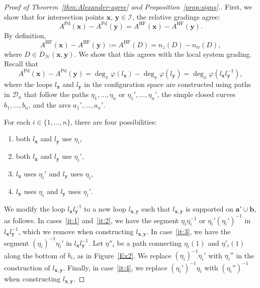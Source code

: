\documentclass[11pt]{amsart}
\numberwithin{equation}{section}
\numberwithin{figure}{section}
\theoremstyle{definition}
\newcommand{\cD}{\mathcal{D}}
\newcommand{\cH}{\mathcal{H}}
\newcommand{\cI}{\mathcal{I}}
\DeclareMathOperator{\HF}{HF}
\DeclareMathOperator{\Pd}{Pd}
\newcommand{\ba}{\boldsymbol{a}}
\newcommand{\bb}{\boldsymbol{b}}
\newcommand{\xs}{\boldsymbol{x}}
\newcommand{\ys}{\boldsymbol{y}}
\begin{document}
\thmidgr*

\begin{proof}[Proof of Theorem~\ref{thm:Alexander-agree} and Proposition~\ref{prop:signs}.] First, we show that for intersection points $\xs$, $\ys \in \cI$, the relative gradings agree:
\begin{equation}\label{eqn:Alexander-agree}
A^{\Pd}(\xs)-A^{\Pd}(\ys) = A^{\HF}(\xs) - A^{\HF}(\ys).
\end{equation}
By definition,
\[
A^{\HF}(\xs)-A^{\HF}(\ys) := A^{\HF}(D) = n_z(D) - n_w(D),
\]
where $D \in D_\cH(\xs, \ys)$.
We show that this agrees with the local system grading. Recall that
\begin{equation}
A^{\Pd}(\xs) - A^{\Pd}(\ys)= \deg_x \varphi (l_{\xs}) - \deg_x \varphi(l_{\ys}) = \deg_x \varphi(l_{\xs}l_{\ys}^{-1}),
\end{equation}
where the loops $l_{\xs}$ and $l_{\ys}$ in the configuration space are constructed using paths in $\cD_n$ that follow the paths $\eta_1,\dots,\eta_n$ or $\eta_1',\dots,\eta_n'$, the simple closed curves $b_1, \dots, b_n$, and the arcs $a_1',\dots,a_n'$.

For each $i \in \{1,\dots,n\}$, there are four possibilities:
\begin{enumerate}
    \item\label{it:1} both $l_{\xs}$ and $l_{\ys}$ use $\eta_i$,
    \item\label{it:2} both $l_{\xs}$ and $l_{\ys}$ use $\eta_i'$,
    \item\label{it:3} $l_{\xs}$ uses $\eta_i'$ and $l_{\ys}$ uses $\eta_i$,
    \item\label{it:4} $l_{\xs}$ uses $\eta_i$ and $l_{\ys}$ uses $\eta_i'$.
\end{enumerate}

We modify the loop $l_{\xs} l_{\ys}^{-1}$ to a new loop $l_{\xs,\ys}$ such that $l_{\xs,\ys}$ is supported on $\ba' \cup \bb$, as follows. In cases~\ref{it:1} and~\ref{it:2}, we have the segment $\eta_i \eta_i^{-1}$ or $\eta_i' (\eta_i')^{-1}$ in $l_{\xs} l_{\ys}^{-1}$, which we remove when constructing $l_{\xs,\ys}$. In case~\ref{it:3}, we have the segment $(\eta_i)^{-1} \eta_i'$ in $l_{\xs} l_{\ys}^{-1}$. Let $\eta''_i$ be a path connecting $\eta_i(1)$ and $\eta'_i(1)$ along the bottom of $b_i$, as in Figure~\ref{Ex2}. We replace $(\eta_i)^{-1} \eta_i'$ with $\eta_i''$ in the construction of $l_{\xs,\ys}$. Finally, in case~\ref{it:4}, we replace $(\eta_i')^{-1} \eta_i$ with $(\eta_i'')^{-1}$ when constructing $l_{\xs,\ys}$.


\end{proof}
\end{document}
